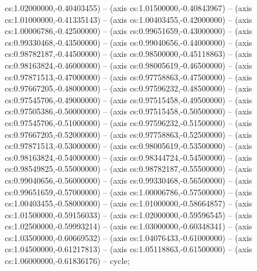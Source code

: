 cs:1.02000000,-0.40403455) -- (axis cs:1.01500000,-0.40843967) -- (axis cs:1.01000000,-0.41335143) -- (axis cs:1.00403455,-0.42000000) -- (axis cs:1.00006786,-0.42500000) -- (axis cs:0.99651659,-0.43000000) -- (axis cs:0.99330468,-0.43500000) -- (axis cs:0.99040656,-0.44000000) -- (axis cs:0.98782187,-0.44500000) -- (axis cs:0.98500000,-0.45118863) -- (axis cs:0.98163824,-0.46000000) -- (axis cs:0.98005619,-0.46500000) -- (axis cs:0.97871513,-0.47000000) -- (axis cs:0.97758863,-0.47500000) -- (axis cs:0.97667205,-0.48000000) -- (axis cs:0.97596232,-0.48500000) -- (axis cs:0.97545706,-0.49000000) -- (axis cs:0.97515458,-0.49500000) -- (axis cs:0.97505386,-0.50000000) -- (axis cs:0.97515458,-0.50500000) -- (axis cs:0.97545706,-0.51000000) -- (axis cs:0.97596232,-0.51500000) -- (axis cs:0.97667205,-0.52000000) -- (axis cs:0.97758863,-0.52500000) -- (axis cs:0.97871513,-0.53000000) -- (axis cs:0.98005619,-0.53500000) -- (axis cs:0.98163824,-0.54000000) -- (axis cs:0.98344724,-0.54500000) -- (axis cs:0.98549825,-0.55000000) -- (axis cs:0.98782187,-0.55500000) -- (axis cs:0.99040656,-0.56000000) -- (axis cs:0.99330468,-0.56500000) -- (axis cs:0.99651659,-0.57000000) -- (axis cs:1.00006786,-0.57500000) -- (axis cs:1.00403455,-0.58000000) -- (axis cs:1.01000000,-0.58664857) -- (axis cs:1.01500000,-0.59156033) -- (axis cs:1.02000000,-0.59596545) -- (axis cs:1.02500000,-0.59993214) -- (axis cs:1.03000000,-0.60348341) -- (axis cs:1.03500000,-0.60669532) -- (axis cs:1.04076433,-0.61000000) -- (axis cs:1.04500000,-0.61217813) -- (axis cs:1.05118863,-0.61500000) -- (axis cs:1.06000000,-0.61836176) -- cycle;
